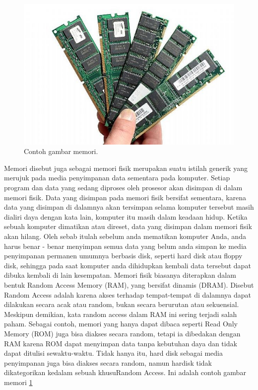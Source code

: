 ﻿%


\begin{figure}[ht]
\centerline{\includegraphics[width=1\textwidth]{figures/memori.jpg}}
\caption{Contoh gambar memori.}
\label{memori}
\end{figure}

Memori disebut juga sebagai memori fisik merupakan suatu istilah generik yang merujuk pada media penyimpanan data sementara pada komputer. Setiap program dan data yang sedang diproses oleh prosesor akan disimpan di dalam memori fisik. Data yang disimpan pada memori fisik bersifat sementara, karena data yang disimpan di dalamnya akan tersimpan selama komputer tersebut masih dialiri daya dengan kata lain, komputer itu masih dalam keadaan hidup. Ketika sebuah komputer dimatikan atau direset, data yang disimpan dalam memori fisik akan hilang. Oleh sebab itulah sebelum anda mematikan komputer Anda, anda harus benar - benar menyimpan semua data yang belum anda simpan ke media penyimpanan permanen umumnya berbasis disk, seperti hard disk atau floppy disk, sehingga pada saat komputer anda dihidupkan kembali data tersebut dapat dibuka kembali di lain kesempatan. Memori fisik biasanya diterapkan dalam bentuk Random Access Memory (RAM), yang bersifat dinamis (DRAM). Disebut Random Access adalah karena akses terhadap tempat-tempat di dalamnya dapat dilakukan secara acak atau random, bukan secara berurutan atau sekuensial. Meskipun demikian, kata random access dalam RAM ini sering terjadi salah paham. Sebagai contoh, memori yang hanya dapat dibaca seperti Read Only Memory (ROM) juga bisa diakses secara random, tetapi ia dibedakan dengan RAM karena ROM dapat menyimpan data tanpa kebutuhan daya dan tidak dapat ditulisi sewaktu-waktu. Tidak hanya itu, hard disk sebagai media penyimpanan juga bisa diakses secara random, namun hardisk tidak dikategorikan kedalam sebuah khusuRandom Access. Ini adalah contoh gambar memori \ref{memori}

